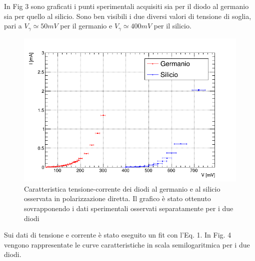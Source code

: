 \documentclass[a4paper,11pt]{article}
\begin{document}
In Fig 3 sono graficati i punti sperimentali acquisiti sia per il diodo al germanio sia per quello al silicio. Sono ben visibili i due diversi valori di tensione di soglia, pari a $V_\gamma \simeq 50 mV $ per il germanio e $V_\gamma \simeq 400 mV $ per il silicio.


\begin{figure} [h!]
  \centering
  \includegraphics[width=0.7\linewidth]{../analisi dati/caratteristiche _dati.png}
  \caption{Caratteristica tensione-corrente dei diodi al germanio e al silicio osservata in polarizzazione diretta. Il grafico è stato ottenuto sovrapponendo i dati sperimentali osservati separatamente per i due diodi}
\end{figure}

Sui dati di tensione e corrente è stato eseguito un fit con l'Eq. 1. In Fig. 4 vengono rappresentate le curve caratteristiche in scala semilogaritmica per i due diodi.
\end{document}
